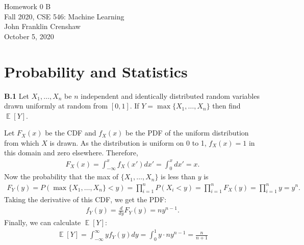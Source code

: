 \documentclass{article}
\DeclareMathOperator{\E}{\mathbb{E}}
\newenvironment{solution}{\begin{adjustwidth}{8mm}{}}{\end{adjustwidth}}
\renewcommand{\title}{Homework 0 B}
\renewcommand{\date}{October 5, 2020}
\begin{document}
\begin{center}
        \LARGE \title \\ \vspace{10pt}
        \normalsize 
        Fall 2020, CSE 546: Machine Learning \\ \vspace{2pt}
        John Franklin Crenshaw \\ \vspace{2pt}
        \date
\end{center}


\section*{Probability and Statistics}

\textbf{B.1}
Let $X_1,\dots,X_n$ be $n$ independent and identically distributed random variables drawn uniformly at random from $[0,1]$.
If $Y = \max \{X_1,\dots,X_n\}$ then find $\E[Y]$. \newline

\begin{solution}
        Let $F_X(x)$ be the CDF and $f_X(x)$ be the PDF of the uniform distribution from which $X$ is drawn.
        As the distribution is uniform on 0 to 1, $f_X(x) = 1$ in this domain and zero elsewhere.
        Therefore,
        \begin{align*}
                F_X(x) = \int_{-\infty}^{x} f_X(x') dx' = \int_0^x dx' = x.
        \end{align*}
        Now the probability that the max of $\{X_1,\dots,X_n\}$ is less than $y$ is
        \begin{align*}
                F_Y(y) = P(\max\{X_1,\dots,X_n\} < y) 
                = \prod_{i=1}^n P(X_i < y) 
                = \prod_{i=1}^n F_X(y)
                = \prod_{i=1}^n y
                = y^n.
        \end{align*}
        Taking the derivative of this CDF, we get the PDF:
        \begin{align*}
                f_Y(y) = \frac{d}{dy} F_Y(y) = n y^{n-1}.
        \end{align*}
        Finally, we can calculate $\E[Y]$:
        \begin{align*}
                \E[Y] = \int_{-\infty}^{\infty} y f_Y(y) dy
                = \int_0^1 y \cdot n y^{n-1}
                = \frac{n}{n+1}
        \end{align*}

\end{solution}
\end{document}
